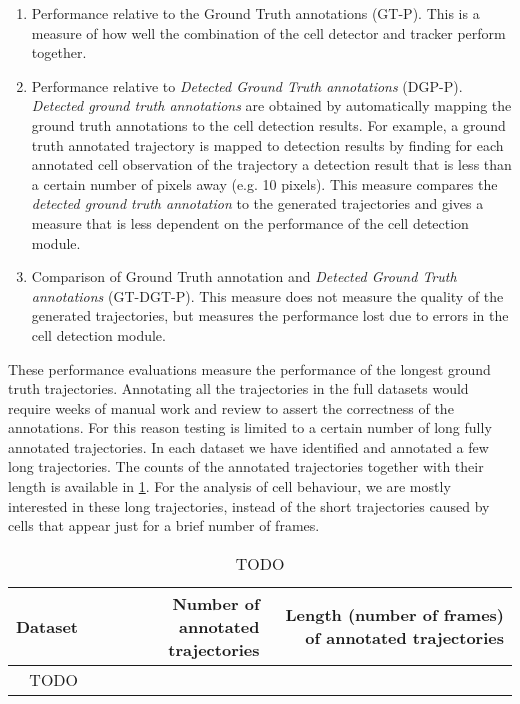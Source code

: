 	\begin{enumerate}
	\item Performance relative to the Ground Truth annotations (GT-P). This is a measure of how well the combination of the cell detector and tracker perform together.
	\item Performance relative to \textit{Detected Ground Truth annotations} (DGP-P). \textit{Detected ground truth annotations} are obtained by automatically mapping the ground truth annotations to the cell detection results. For example, a ground truth annotated trajectory is mapped to detection results by finding for each annotated cell observation of the trajectory a detection result that is less than a certain number of pixels away (e.g. 10 pixels). This measure compares the \textit{detected ground truth annotation} to the generated trajectories and gives a measure that is less dependent on the performance of the cell detection module.
	\item Comparison of Ground Truth annotation and \textit{Detected Ground Truth annotations} (GT-DGT-P). This measure does not measure the quality of the generated trajectories, but measures the performance lost due to errors in the cell detection module. 
	\end{enumerate}
	
	These performance evaluations measure the performance of the longest ground truth trajectories. Annotating all the trajectories in the full datasets would require weeks of manual work and review to assert the correctness of the annotations. For this reason testing is limited to a certain number of long fully annotated trajectories. In each dataset we have identified and annotated a few long trajectories. The counts of the annotated trajectories together with their length is available in \cref{tab:results_counttrajectories}. For the analysis of cell behaviour, we are mostly interested in these long trajectories, instead of the short trajectories caused by cells that appear just for a brief number of frames.
	
	\begin{table}[h]
		\centering
		\begin{tabular}{rrr}
			Dataset & Number of annotated trajectories & Length (number of frames) of annotated trajectories \\
		\hline
		TODO
		\end{tabular} 
		\caption{TODO}
		\label{tab:results_counttrajectories}
	\end{table}

